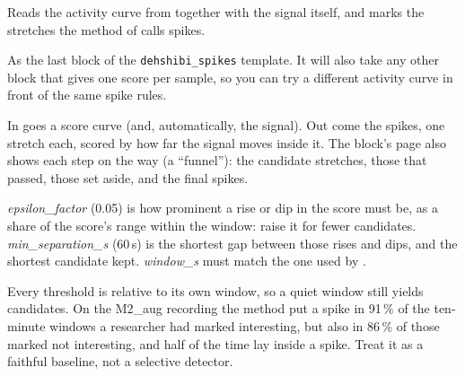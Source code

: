 Reads the activity curve from  together with the signal
itself, and marks the stretches the method of \citet{dehshibi2021electrical} calls spikes.

As the last block of the \texttt{dehshibi\_spikes} template. It will also take any other block
that gives one score per sample, so you can try a different activity curve in front of the
same spike rules.

In goes a score curve (and, automatically, the signal). Out come the spikes, one stretch each,
scored by how far the signal moves inside it. The block's page also shows each step on the way
(a ``funnel''): the candidate stretches, those that passed, those set aside, and the final
spikes.

\emph{epsilon\_factor} (0.05) is how prominent a rise or dip in the score must be, as a share
of the score's range within the window: raise it for fewer candidates. \emph{min\_separation\_s}
(60\,s) is the shortest gap between those rises and dips, and the shortest candidate kept.
\emph{window\_s} must match the one used by .

Every threshold is relative to its own window, so a quiet window still yields candidates. On
the M2\_aug recording the method put a spike in 91\,\% of the ten-minute windows a researcher
had marked interesting, but also in 86\,\% of those marked not interesting, and half of the
time lay inside a spike. Treat it as a faithful baseline, not a selective detector.

